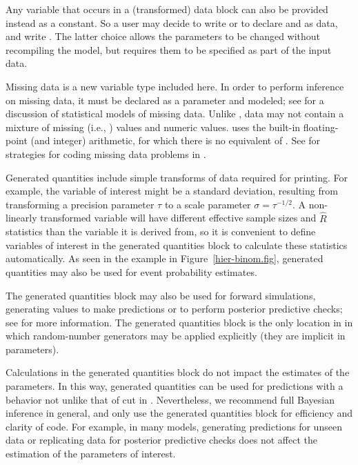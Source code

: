 \documentclass[article]{jss}
\begin{document}
Any variable that occurs in a (transformed) data block can also be
provided instead as a constant.  So a user may decide to write  or to declare  and  as data, and
write .  The latter choice allows the
parameters to be changed without recompiling the model, but requires
them to be specified as part of the input data.

Missing data is a new variable type included here.  In order to
perform inference on missing data, it must be declared as a parameter
and modeled; see \citep{GelmanEtAl:2013} for a discussion of
statistical models of missing data.  Unlike , data may
not contain a mixture of missing (i.e., ) values and numeric
values.   uses the built-in 
floating-point (and integer) arithmetic, for which there is no
equivalent of .  See \citep{Stan:2013} for strategies for
coding missing data problems in .

Generated quantities include simple transforms of data required for
printing.  For example, the variable of interest might be a standard
deviation, resulting from transforming a precision parameter $\tau$ to
a scale parameter $\sigma = \tau^{-1/2}$.  A non-linearly transformed
variable will have different effective sample sizes and $\hat{R}$
statistics than the variable it is derived from, so it is convenient
to define variables of interest in the generated quantities block to
calculate these statistics automatically.  As seen in the example in
Figure~\ref{hier-binom.fig}, generated quantities may also be used for
event probability estimates.

The generated quantities block may also be used for forward
simulations, generating values to make predictions or to perform
posterior predictive checks; see \citep{GelmanEtAl:2013} for more
information.  The generated quantities block is the only location in
 in which random-number generators may be applied
explicitly (they are implicit in parameters).

Calculations in the generated quantities block do not impact the
estimates of the parameters.  In this way, generated quantities can be
used for predictions with a behavior not unlike that of cut in
 \citep{LunnEtAl:2012}.  Nevertheless, we recommend
full Bayesian inference in general, and only use the generated
quantities block for efficiency and clarity of code.  For example, in
many models, generating predictions for unseen data or replicating
data for posterior predictive checks does not affect the estimation of
the parameters of interest.
\end{document}
